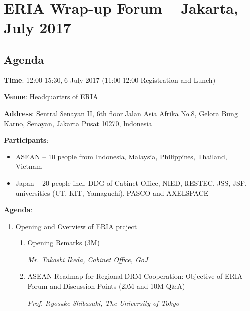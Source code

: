 \section{ERIA Wrap-up Forum -- Jakarta, July 2017} \label{ws_jakarta}


\subsection{Agenda}

{\flushleft

\textbf{Time}: 12:00-15:30, 6 July 2017 (11:00-12:00 Registration and Lunch)

\vspace{0.4 cm}

\textbf{Venue}: Headquarters of ERIA

\vspace{0.4 cm}

\textbf{Address}: Sentral Senayan II, 6th floor Jalan Asia Afrika No.8, Gelora Bung Karno, Senayan, Jakarta Pusat 10270, Indonesia

\vspace{0.4 cm}

\textbf{Participants}:

\begin{itemize}
\item ASEAN -- 10 people from Indonesia, Malaysia, Philippines, Thailand, Vietnam
\item Japan -- 20 people incl. DDG of Cabinet Office, NIED, RESTEC, JSS, JSF, universities (UT, KIT, Yamaguchi), PASCO and AXELSPACE
\end{itemize}

\vspace{0.4 cm}

\textbf{Agenda}:

\begin{enumerate}

\item Opening and Overview of ERIA project

	\begin{enumerate}
	\item Opening Remarks (3M)
	
	\textit{Mr. Takashi Ikeda, Cabinet Office, GoJ}
	\item ASEAN Roadmap for Regional DRM Cooperation: Objective of ERIA Forum and Discussion Points (20M and 10M Q\&A)
	
	\textit{Prof. Ryosuke Shibasaki, The University of Tokyo}
	

\end{enumerate}
\end{enumerate}}
